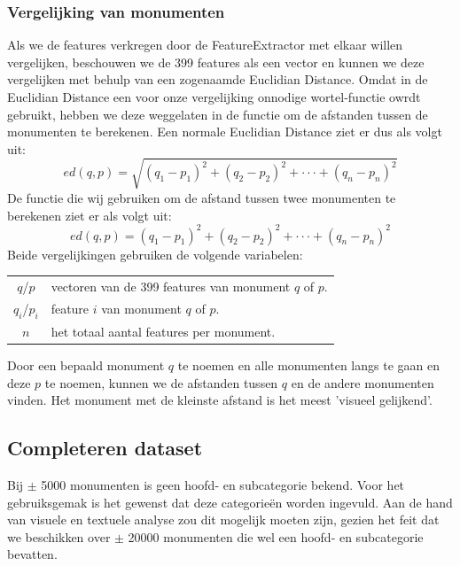 \documentclass[a4paper,10pt]{article}
\begin{document}
		\subsubsection{Vergelijking van monumenten}
		Als we de features verkregen door de FeatureExtractor met elkaar willen vergelijken, beschouwen we de 399 features als een vector en kunnen we deze vergelijken met behulp van een zogenaamde Euclidian Distance. Omdat in de Euclidian Distance een voor onze vergelijking onnodige wortel-functie owrdt gebruikt, hebben we deze weggelaten in de functie om de afstanden tussen de monumenten te berekenen. Een normale Euclidian Distance ziet er dus als volgt uit:
		\begin{equation}
			ed(q, p) = \sqrt{(q_1 - p_1)^2 + (q_2 - p_2)^2 + \cdot\cdot\cdot + (q_n - p_n)^2}
		\end{equation}
		De functie die wij gebruiken om de afstand tussen twee monumenten te berekenen ziet er als volgt uit:
		\begin{equation}
			ed(q, p) = (q_1 - p_1)^2 + (q_2 - p_2)^2 + \cdot\cdot\cdot + (q_n - p_n)^2
		\end{equation}
		Beide vergelijkingen gebruiken de volgende variabelen:
		\begin{center}
			\begin{tabular}{ c | l }
				$q$/$p$ & vectoren van de 399 features van monument $q$ of $p$.\\
				$q_{i}$/$p_{i}$ & feature $i$ van monument $q$ of $p$.\\
				$n$ & het totaal aantal features per monument.
			\end{tabular}
		\end{center}
		
		Door een bepaald monument $q$ te noemen en alle monumenten langs te gaan en deze $p$ te noemen, kunnen we de afstanden tussen $q$ en de andere monumenten vinden. Het monument met de kleinste afstand is het meest 'visueel gelijkend'.
		
	\subsection{Completeren dataset}
	Bij $\pm$ 5000 monumenten is geen hoofd- en subcategorie bekend. Voor het gebruiksgemak is het gewenst dat deze categorie\"en worden ingevuld. Aan de hand van visuele en textuele analyse zou dit mogelijk moeten zijn, gezien het feit dat we beschikken over $\pm$ 20000 monumenten die wel een hoofd- en subcategorie bevatten.
	
\end{document}
